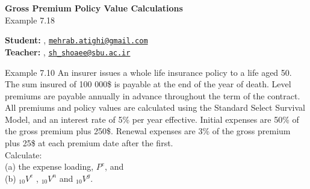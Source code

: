 


\usepackage{actuarialsymbol}


	\begin{Large}
		\textsf{\textbf{Gross Premium Policy Value Calculations}}\\
		Example 7.18
	\end{Large}
	
	\vspace{1ex}
	
	\textsf{\textbf{Student:}} , \href{mailto:mehrab.atighi@gmail.com}{\texttt{mehrab.atighi@gmail.com}}\\
	\textsf{\textbf{Teacher:}} , \href{mailto:sh_shoaee@sbu.ac.ir}{\texttt{sh\_shoaee@sbu.ac.ir}}
	
	\vspace{2ex}
	
	\begin{problem}{}{Example 7.10}
		An insurer issues a whole life insurance policy to a life aged 50. The sum insured of 100 000\$ is payable at the end of the year of death. Level premiums are payable annually in advance throughout the term of the contract. All premiums and policy values are calculated using the Standard Select Survival Model, and an interest rate of 5\% per year effective. Initial expenses are 50\% of the gross premium plus 250\$. Renewal expenses are 3\% of the gross premium plus 25\$ at each premium date after the first.\\
		Calculate:\\
		(a) the expense loading, $P^e$, and\\
		(b) $_{10}V^e$ , $_{10}V^n$ and $_{10}V^g$.
	\end{problem}
	
